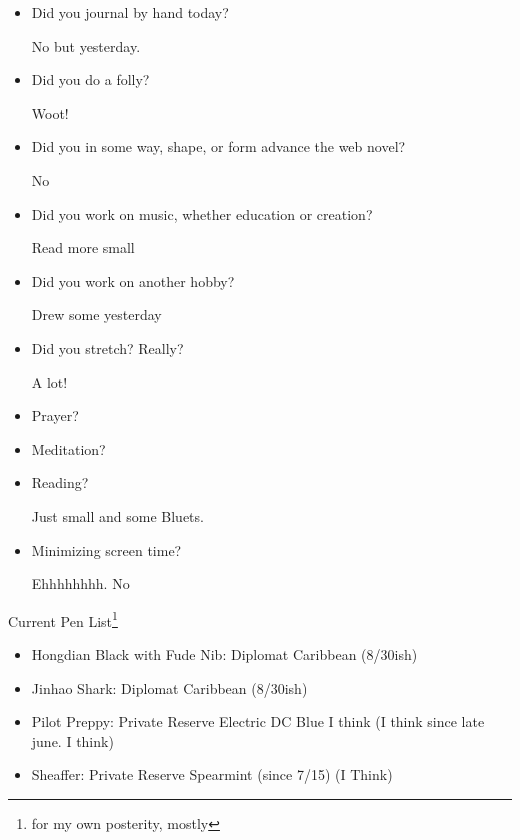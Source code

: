 \documentclass[12pt]{article}
\renewcommand{\,}{\textsuperscript{,}}
\begin{document}
\begin{itemize}

\item Did you journal by hand today?

No but yesterday.

\item Did you do a folly?

Woot!
\item Did you in some way, shape, or form advance the web novel?

No

\item Did you work on music, whether education or creation?

Read more small

\item Did you work on another hobby?

Drew some yesterday

\item Did you stretch? Really?

A lot!

\item Prayer?

\item Meditation?

\item Reading?

Just small and some Bluets.

\item Minimizing screen time?

Ehhhhhhhh. No

\end{itemize}

Current Pen List\footnote{for my own posterity, mostly}

\begin{itemize}  
\item Hongdian Black with Fude Nib: Diplomat Caribbean (8/30ish)  
\item Jinhao Shark: Diplomat Caribbean (8/30ish)  
\item Pilot Preppy: Private Reserve Electric DC Blue I think (I think since late june. I think)  
\item Sheaffer: Private Reserve Spearmint (since 7/15) (I Think)
\end{itemize}
\end{document}
